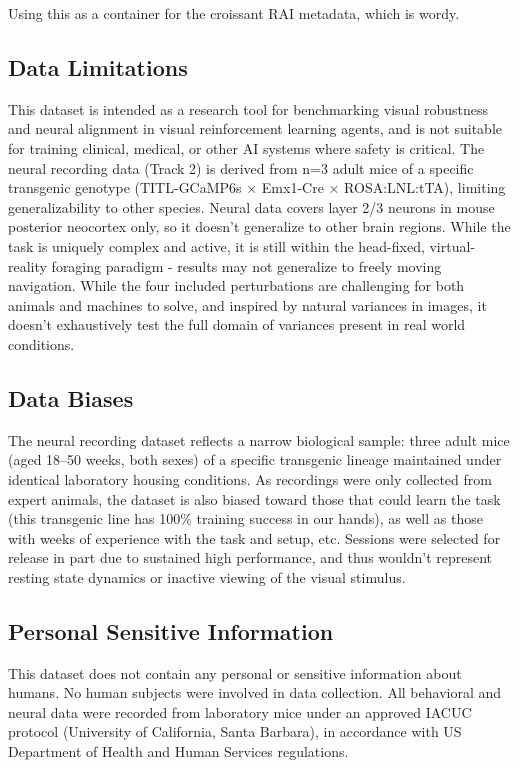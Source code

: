 Using this as a container for the croissant RAI metadata, which is wordy.

\subsection{Data Limitations}

This dataset is intended as a research tool for benchmarking visual robustness and neural alignment in visual reinforcement learning agents, and is not suitable for training clinical, medical, or other AI systems where safety is critical. The neural recording data (Track 2) is derived from n=3 adult mice of a specific transgenic genotype (TITL-GCaMP6s × Emx1-Cre × ROSA:LNL:tTA), limiting generalizability to other species. Neural data covers layer 2/3 neurons in mouse posterior neocortex only, so it doesn't generalize to other brain regions. While the task is uniquely complex and active, it is still within the head-fixed, virtual-reality foraging paradigm - results may not generalize to freely moving navigation. While the four included perturbations are challenging for both animals and machines to solve, and inspired by natural variances in images, it doesn't exhaustively test the full domain of variances present in real world conditions. 


\subsection{Data Biases}

The neural recording dataset reflects a narrow biological sample: three adult mice (aged 18–50 weeks, both sexes) of a specific transgenic lineage maintained under identical laboratory housing conditions. As recordings were only collected from expert animals, the dataset is also biased toward those that could learn the task (this transgenic line has 100\% training success in our hands), as well as those with weeks of experience with the task and setup, etc. Sessions were selected for release in part due to sustained high performance, and thus wouldn't represent resting state dynamics or inactive viewing of the visual stimulus.


\subsection{Personal Sensitive Information}
This dataset does not contain any personal or sensitive information about humans. No human subjects were involved in data collection. All behavioral and neural data were recorded from laboratory mice under an approved IACUC protocol (University of California, Santa Barbara), in accordance with US Department of Health and Human Services regulations. 

